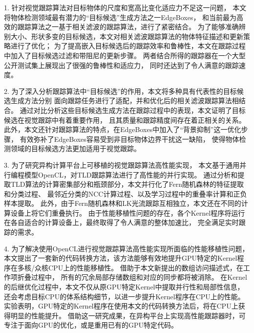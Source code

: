 \begin{compactitem}
\item[1.]
针对视觉跟踪算法对目标物体的尺度和宽高比变化适应力不足这一问题，
本文将物体检测领域最有潜力的``目标候选''生成方法之一\pozhehao EdgeBoxes，
和当前最为高效的跟踪算法之一\pozhehao 基于相关滤波的跟踪算法，进行了紧密结合。
为了能够准确辨别大小、形状多变的目标候选，本文对相关滤波跟踪算法的物体特征描述和更新策略进行了优化；
为了提高嵌入目标候选后的跟踪效率和鲁棒性，本文在跟踪过程中加入了目标候选过滤和带阻尼的更新步骤。
两者结合所得的跟踪器在一个大型公开测试集上展现出了很强的鲁棒性和适应力，
同时还达到了令人满意的跟踪速度。

\item[2.]
为了深入分析跟踪算法中``目标候选''的作用，本文将多种具有代表性的目标候选生成方法分别
面向跟踪任务进行了适配，并和优化后的相关滤波跟踪算法相结合。
通过对比分析这些目标候选生成方法在跟踪过程中的表现，本文证明了目标候选在视觉跟踪中有着重要作用，
且其质量和跟踪精度间存在着正相关的关系。
此外，本文还针对跟踪算法的特点，在EdgeBoxes中加入了``背景抑制''这一优化步骤，
有效弥补了EdgeBoxes容易受到非目标物体边界干扰这一缺陷，
使得物体检测领域的目标候选方法更加适用于视觉跟踪。

\item[3.]	
为了研究异构计算平台上可移植的视觉跟踪算法高性能实现，
本文基于通用并行编程模型OpenCL，对TLD跟踪算法进行了高性能的并行实现。
通过分析和提取TLD算法的计算密集部分和瓶颈部分，本文并行化了Fern随机森林的特征提取和分类过程、
最邻近分类的NCC计算过程、以及学习过程中的重叠率计算和正负样本提取。
此外，由于Fern随机森林和LK光流跟踪互相独立，本文还在不同的计算设备上将它们重叠执行。
由于性能移植性问题的存在，各个Kernel程序将运行在各自适合的计算设备上，最终取得了令人满意的整体加速比，
完全满足实时跟踪的需求。

\item[4.]	
为了解决使用OpenCL进行视觉跟踪算法高性能实现所面临的性能移植性问题，
本文提出了一套新的代码转换方法，该方法能够有效地提升GPU特定的Kernel程序在多核/众核CPU上的性能移植性。
借助于本文新提出的数组访问描述式，在工作项折叠过程中，
所有的冗余局部存储数组和对应的同步都将被消除。
在Kernel的后继优化过程中，本文不仅从原GPU特定Kernel中提取并行性和局部性信息，
还会考虑目标CPU的体系结构细节，以进一步提升Kernel程序在CPU上的性能。
实验表明，GPU特定的Kernel程序在使用本文的代码转换方法后，将在CPU上获得明显的性能提升。
借助这一研究成果，在异构平台上实现高性能跟踪器时，可专注于面向GPU的优化，或是重用已有的GPU特定代码。
\end{compactitem}

